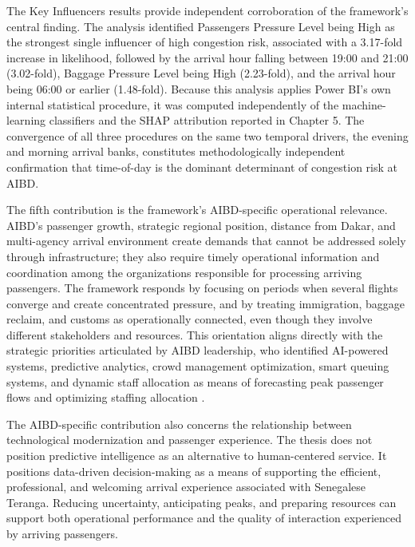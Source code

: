 The Key Influencers results provide independent corroboration of the framework’s central finding. The analysis identified Passengers Pressure Level being High as the strongest single influencer of high congestion risk, associated with a 3.17-fold increase in likelihood, followed by the arrival hour falling between 19:00 and 21:00 (3.02-fold), Baggage Pressure Level being High (2.23-fold), and the arrival hour being 06:00 or earlier (1.48-fold). Because this analysis applies Power BI’s own internal statistical procedure, it was computed independently of the machine-learning classifiers and the SHAP attribution reported in Chapter 5. The convergence of all three procedures on the same two temporal drivers, the evening and morning arrival banks, constitutes methodologically independent confirmation that time-of-day is the dominant determinant of congestion risk at AIBD.

The fifth contribution is the framework’s AIBD-specific operational relevance. AIBD’s passenger growth, strategic regional position, distance from Dakar, and multi-agency arrival environment create demands that cannot be addressed solely through infrastructure; they also require timely operational information and coordination among the organizations responsible for processing arriving passengers. The framework responds by focusing on periods when several flights converge and create concentrated pressure, and by treating immigration, baggage reclaim, and customs as operationally connected, even though they involve different stakeholders and resources. This orientation aligns directly with the strategic priorities articulated by AIBD leadership, who identified AI-powered systems, predictive analytics, crowd management optimization, smart queuing systems, and dynamic staff allocation as means of forecasting peak passenger flows and optimizing staffing allocation \parencite{demir2025speaker}.

The AIBD-specific contribution also concerns the relationship between technological modernization and passenger experience. The thesis does not position predictive intelligence as an alternative to human-centered service. It positions data-driven decision-making as a means of supporting the efficient, professional, and welcoming arrival experience associated with Senegalese Teranga. Reducing uncertainty, anticipating peaks, and preparing resources can support both operational performance and the quality of interaction experienced by arriving passengers.

